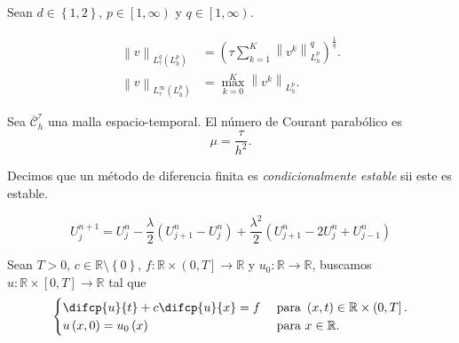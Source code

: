 \begin{definition}
    Sean
    \begin{math}
        d\in\left\{1,2\right\}
    \end{math},
    \begin{math}
        p\in
        \left[1,\infty\right)
    \end{math}
    y
    \begin{math}
        q\in\left[1,\infty\right)
    \end{math}.

    \begin{align*}
        {\left\|v\right\|}_{
            L^{q}_{\tau}\left(L^{p}_{h}\right)
        }
         & =
        {\left(
        \tau\sum_{k=1}^{K}
        \left\|v^{k}\right\|^{q}_{L^{p}_{h}}
        \right)}^{\frac{1}{q}}. \\
        {\left\|v\right\|}_{L^{\infty}_{\tau}\left(L^{p}_{h}\right)}
         & =
        \max^{K}_{k=0}
        {\left\|v^{k}\right\|}_{L^{p}_{h}}.
    \end{align*}
\end{definition}

\begin{definition}
    Sea $\overline{\mathcal{C}}^{\tau}_{h}$ una malla
    espacio-temporal.
    El número de Courant parabólico es
    \begin{equation*}
        \mu=
        \dfrac{\tau}{h^{2}}.
    \end{equation*}
\end{definition}

\begin{definition}
    Decimos que un método de diferencia finita es
    \emph{condicionalmente estable} sii este es estable.
\end{definition}

\begin{equation*}
    U^{n+1}_{j}=
    U^{n}_{j}-
    \dfrac{\lambda}{2}
    \left(U^{n}_{j+1}-U^{n}_{j}\right)+
    \dfrac{\lambda^{2}}{2}
    \left(
    U^{n}_{j+1}-
    2U^{n}_{j}+
    U^{n}_{j-1}
    \right)
\end{equation*}

\begin{example}
    Sean $T>0$, $c\in\mathbb{R}\setminus\left\{0\right\}$,
    $f\colon\mathbb{R}\times\left(0,T\right]\to\mathbb{R}$ y
    $u_{0}\colon\mathbb{R}\to\mathbb{R}$, buscamos
    $u\colon\mathbb{R}\times\left[0,T\right]\to\mathbb{R}$
    tal que
    \begin{equation}
        \begin{cases}
            \difcp{u}{t}+
            c\difcp{u}{x}=f
             & \text{ para }
            \left(x,t\right)\in\mathbb{R}\times\left(0,T\right]. \\
            u\left(x,0\right)=u_{0}\left(x\right)
             & \text{ para }
            x\in\mathbb{R}.
        \end{cases}\label{eq:pde_transport}
    \end{equation}
\end{example}

